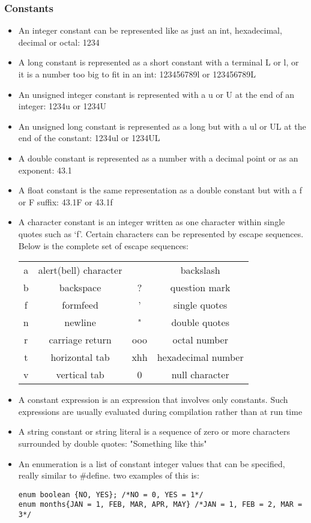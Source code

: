 \subsubsection{Constants}
\begin{itemize}[--]
	\item An integer constant can be represented like as just an int, hexadecimal, decimal or octal: 1234
	\item A long constant is represented as a short constant with a terminal L or l, or it is a number too big to fit in an int: 123456789l or 123456789L
	\item An unsigned integer constant is represented with a u or U at the end of an integer: 1234u or 1234U
	\item An unsigned long constant is represented as a long but with a ul or UL at the end of the constant: 1234ul or 1234UL
	\item A double constant is represented as a number with a decimal point or as an exponent: 43.1
	\item A float constant is the same representation as a double constant but with a f or F suffix: 43.1F or 43.1f
	\item A character constant is an integer written as one character within single quotes such as `f'. Certain characters can be represented by escape
		  sequences. Below is the complete set of escape sequences:
	\begin{tabular}{c | c || c | c}
		\hline 
		a & alert(bell) character & \ & backslash \\
		b & backspace & ? & question mark \\
		f & formfeed & ' & single quotes \\
		n & newline & " & double quotes \\
		r & carriage return & ooo & octal number \\
		t & horizontal tab & xhh & hexadecimal number \\
		v & vertical tab  & 0 & null character
	\end{tabular}
	
	\item A constant expression is an expression that involves only constants. Such expressions are usually evaluated during compilation rather than at run time
	\item A string constant or string literal is a sequence of zero or more characters surrounded by double quotes: "Something like this"	
	\item An enumeration is a list of constant integer values that can be specified, really similar to \#define. two examples of this is: 
	\begin{lstlisting}[style=s-C++] 
enum boolean {NO, YES}; /*NO = 0, YES = 1*/
enum months{JAN = 1, FEB, MAR, APR, MAY} /*JAN = 1, FEB = 2, MAR = 3*/
	\end{lstlisting}

\end{itemize}


